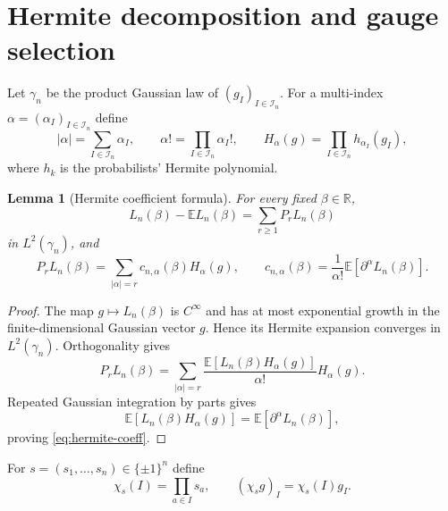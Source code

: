 \documentclass[11pt]{article}
\newtheorem{lemma}[theorem]{Lemma}
\newcommand{\E}{\mathbb{E}}
\newcommand{\R}{\mathbb{R}}
\newcommand{\calI}{\mathcal{I}}
\begin{document}
\section{Hermite decomposition and gauge selection}

Let $\gamma_n$ be the product Gaussian law of $(g_I)_{I\in\calI_n}$.  For a
multi-index $\alpha=(\alpha_I)_{I\in\calI_n}$ define
\begin{equation}\label{eq:multi-index}
  |\alpha|=\sum_{I\in\calI_n}\alpha_I,
  \qquad
  \alpha!=\prod_{I\in\calI_n}\alpha_I!,
  \qquad
  H_\alpha(g)=\prod_{I\in\calI_n}h_{\alpha_I}(g_I),
\end{equation}
where $h_k$ is the probabilists' Hermite polynomial.

\begin{lemma}[Hermite coefficient formula]\label{lem:hermite-coeff}
  For every fixed $\beta\in\R$,
  \begin{equation}\label{eq:chaos-decomposition}
    L_n(\beta)-\E L_n(\beta)
    =
    \sum_{r\geq1}P_rL_n(\beta)
  \end{equation}
  in $L^2(\gamma_n)$, and
  \begin{equation}\label{eq:hermite-coeff}
    P_rL_n(\beta)
    =
    \sum_{|\alpha|=r}c_{n,\alpha}(\beta)H_\alpha(g),
    \qquad
    c_{n,\alpha}(\beta)
    =
    \frac1{\alpha!}\E[\partial^\alpha L_n(\beta)].
  \end{equation}
\end{lemma}

\begin{proof}
  The map $g\mapsto L_n(\beta)$ is $C^\infty$ and has at most exponential
  growth in the finite-dimensional Gaussian vector $g$.  Hence its Hermite
  expansion converges in $L^2(\gamma_n)$.  Orthogonality gives
  \begin{equation}\label{eq:hermite-projection}
    P_rL_n(\beta)
    =
    \sum_{|\alpha|=r}
    \frac{\E[L_n(\beta)H_\alpha(g)]}{\alpha!}H_\alpha(g).
  \end{equation}
  Repeated Gaussian integration by parts gives
  \begin{equation}\label{eq:gibp-hermite}
    \E[L_n(\beta)H_\alpha(g)]=\E[\partial^\alpha L_n(\beta)],
  \end{equation}
  proving \eqref{eq:hermite-coeff}.
\end{proof}

For $s=(s_1,\ldots,s_n)\in\{\pm1\}^n$ define
\begin{equation}\label{eq:chi-s}
  \chi_s(I)=\prod_{a\in I}s_a,
  \qquad
  (\chi_sg)_I=\chi_s(I)g_I.
\end{equation}
\end{document}
